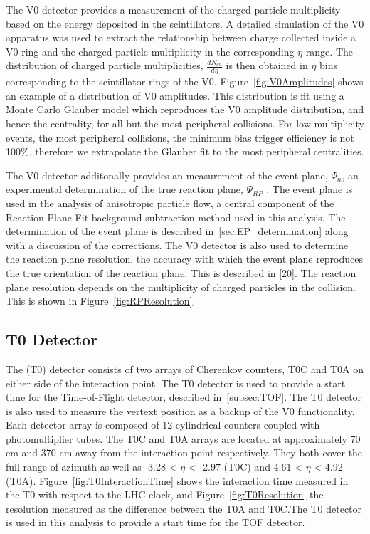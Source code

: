 The V0 detector provides a measurement of the charged particle multiplicity based on the energy deposited in the scintillators. A detailed simulation of the V0 apparatus was used to extract the relationship between charge collected inside a V0 ring and the charged particle multiplicity in the corresponding $\eta$ range. The distribution of charged particle multiplicities, $\frac{dN_{ch}}{d\eta}$ is then obtained in $\eta$ bins corresponding to the scintillator rings of the V0. Figure~\ref{fig:V0Amplitudes} shows an example of a distribution of V0 amplitudes. This distribution is fit using a Monte Carlo Glauber model which reproduces the V0 amplitude distribution, and hence the centrality, for all but the most peripheral collisions. For low multiplicity events, the most peripheral collisions, the minimum bias trigger efficiency is not 100\%, therefore we extrapolate the Glauber fit to the most peripheral centralities.

The V0 detector additonally provides an measurement of the event plane, $\Psi_n$, an experimental determination of the true reaction plane, $\Psi_{RP}$ . The event plane is used in the analysis of anisotropic particle flow, a central component of the Reaction Plane Fit background subtraction method used in this analysis. The determination of the event plane is described in~\ref{sec:EP_determination} along with a discussion of the corrections. The V0 detector is also used to determine the reaction plane resolution, the accuracy with which the event plane reproduces the true orientation of the reaction plane. This is described in [20]. The reaction plane resolution depends on the multiplicity of charged particles in the collision. This is shown in Figure~\ref{fig:RPResolution}.

\subsection*{T0 Detector}

The (T0) detector consists of two arrays of Cherenkov counters, T0C and T0A on either side of the interaction point. The T0 detector is used to provide a start time for the Time-of-Flight detector, described in~\ref{subsec:TOF}. The T0 detector is also used to measure the vertext position as a backup of the V0 functionality. Each detector array is composed of 12 cylindrical counters coupled with photomultiplier tubes. The T0C and T0A arrays are located at approximately 70 cm and 370 cm away from the interaction point respectively. They both cover the full range of azimuth as well as -3.28 < $\eta$ < -2.97 (T0C) and 4.61 < $\eta$ < 4.92 (T0A). Figure~\ref{fig:T0InteractionTime} shows the interaction time measured in the T0 with respect to the LHC clock, and Figure~\ref{fig:T0Resolution} the resolution measured as the difference between the T0A and T0C.The T0 detector is used in this analysis to provide a start time for the TOF detector.

